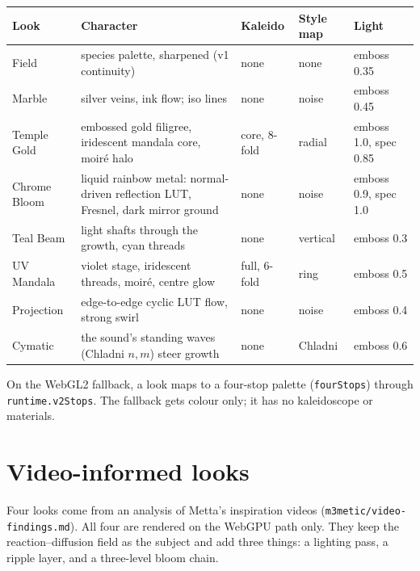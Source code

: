 \documentclass[10pt,a4paper]{article}
\newcommand{\code}[1]{\texttt{\small #1}}
\begin{document}
\begin{center}\small
\begin{tabularx}{\linewidth}{@{}l L l l l@{}}
\toprule
Look & Character & Kaleido & Style map & Light\\
\midrule
Field & species palette, sharpened (v1 continuity) & none & none & emboss 0.35\\
Marble & silver veins, ink flow; iso lines & none & noise & emboss 0.45\\
Temple Gold & embossed gold filigree, iridescent mandala core, moir\'e halo & core, 8-fold & radial & emboss 1.0, spec 0.85\\
Chrome Bloom & liquid rainbow metal: normal-driven reflection LUT, Fresnel, dark mirror ground & none & noise & emboss 0.9, spec 1.0\\
Teal Beam & light shafts through the growth, cyan threads & none & vertical & emboss 0.3\\
UV Mandala & violet stage, iridescent threads, moir\'e, centre glow & full, 6-fold & ring & emboss 0.5\\
Projection & edge-to-edge cyclic LUT flow, strong swirl & none & noise & emboss 0.4\\
Cymatic & the sound's standing waves (Chladni $n,m$) steer growth & none & Chladni & emboss 0.6\\
\bottomrule
\end{tabularx}\end{center}
On the WebGL2 fallback, a look maps to a four-stop palette (\code{fourStops}) through \code{runtime.v2Stops}. The fallback gets
colour only; it has no kaleidoscope or materials.

\section{Video-informed looks}\label{sec:video}
Four looks come from an analysis of Metta's inspiration videos (\code{m3metic/video-findings.md}). All four are rendered on the WebGPU path only.
They keep the reaction--diffusion field as the subject and add three things: a lighting pass, a ripple layer, and a three-level bloom chain.
\end{document}

